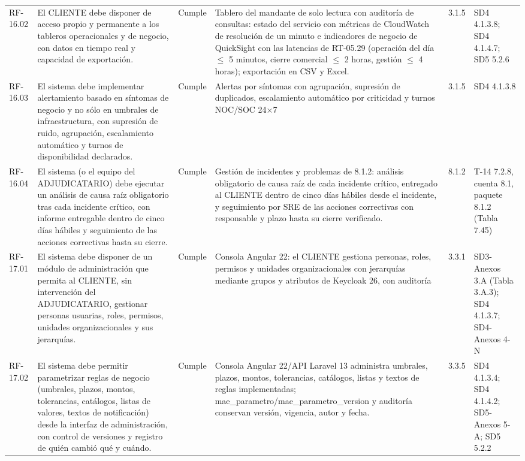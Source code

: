 \documentclass[carta,firma,final]{lafrox}
\begin{document}
\begin{landscape}
{\begin{longtable}{@{}F{0.070} F{0.255} F{0.075} F{0.280} F{0.090} F{0.230}@{}}
  RF-16.02 & El CLIENTE debe disponer de acceso propio y permanente a los tableros operacionales y de negocio, con datos en tiempo real y capacidad de exportación. & Cumple & Tablero del mandante de solo lectura con auditoría de consultas: estado del servicio con métricas de CloudWatch de resolución de un minuto e indicadores de negocio de QuickSight con las latencias de RT-05.29 (operación del día $\leq$ 5 minutos, cierre comercial $\leq$ 2 horas, gestión $\leq$ 4 horas); exportación en CSV y Excel. & 3.1.5 & SD4 4.1.3.8; SD4 4.1.4.7; SD5 5.2.6 \\
  RF-16.03 & El sistema debe implementar alertamiento basado en síntomas de negocio y no sólo en umbrales de infraestructura, con supresión de ruido, agrupación, escalamiento automático y turnos de disponibilidad declarados. & Cumple & Alertas por síntomas con agrupación, supresión de duplicados, escalamiento automático por criticidad y turnos NOC/SOC 24$\times$7 & 3.1.5 & SD4 4.1.3.8 \\
  RF-16.04 & El sistema (o el equipo del ADJUDICATARIO) debe ejecutar un análisis de causa raíz obligatorio tras cada incidente crítico, con informe entregable dentro de cinco días hábiles y seguimiento de las acciones correctivas hasta su cierre. & Cumple & Gestión de incidentes y problemas de 8.1.2: análisis obligatorio de causa raíz de cada incidente crítico, entregado al CLIENTE dentro de cinco días hábiles desde el incidente, y seguimiento por SRE de las acciones correctivas con responsable y plazo hasta su cierre verificado. & 8.1.2 & T-14 7.2.8, cuenta 8.1, paquete 8.1.2 (Tabla 7.45) \\
  RF-17.01 & El sistema debe disponer de un módulo de administración que permita al CLIENTE, sin intervención del ADJUDICATARIO, gestionar personas usuarias, roles, permisos, unidades organizacionales y sus jerarquías. & Cumple & Consola Angular 22: el CLIENTE gestiona personas, roles, permisos y unidades organizacionales con jerarquías mediante grupos y atributos de Keycloak 26, con auditoría & 3.3.1 & SD3-Anexos 3.A (Tabla 3.A.3); SD4 4.1.3.7; SD4-Anexos 4-N \\
  RF-17.02 & El sistema debe permitir parametrizar reglas de negocio (umbrales, plazos, montos, tolerancias, catálogos, listas de valores, textos de notificación) desde la interfaz de administración, con control de versiones y registro de quién cambió qué y cuándo. & Cumple & Consola Angular 22/API Laravel 13 administra umbrales, plazos, montos, tolerancias, catálogos, listas y textos de reglas implementadas; mae\_parametro/mae\_parametro\_version y auditoría conservan versión, vigencia, autor y fecha. & 3.3.5 & SD4 4.1.3.4; SD4 4.1.4.2; SD5-Anexos 5-A; SD5 5.2.2 \\

\end{longtable}}
\end{landscape}
\end{document}
